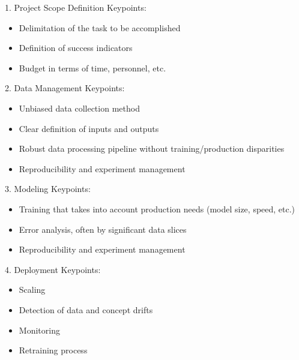 \begin{frame}{1. Project Scope Definition}
  Keypoints:
  \begin{itemize}
    \item Delimitation of the task to be accomplished
    \item Definition of success indicators
    \item Budget in terms of time, personnel, etc.
    \end{itemize}

    \hugo
\end{frame}

\begin{frame}{2. Data Management}
  Keypoints:
  \begin{itemize}
    \item Unbiased data collection method
    \item Clear definition of inputs and outputs
    \item Robust data processing pipeline without training/production disparities
    \item Reproducibility and experiment management
  \end{itemize}

  \hugo
\end{frame}

\begin{frame}{3. Modeling}
  Keypoints:
  \begin{itemize}
    \item Training that takes into account production needs (model size, speed, etc.)
    \item Error analysis, often by significant data slices
    \item Reproducibility and experiment management
  \end{itemize}

  \hugo
\end{frame}

\begin{frame}{4. Deployment}
  Keypoints:
  \begin{itemize}
    \item Scaling
    \item Detection of data and concept drifts
    \item Monitoring
    \item Retraining process
  \end{itemize}

  \hugo
\end{frame}


